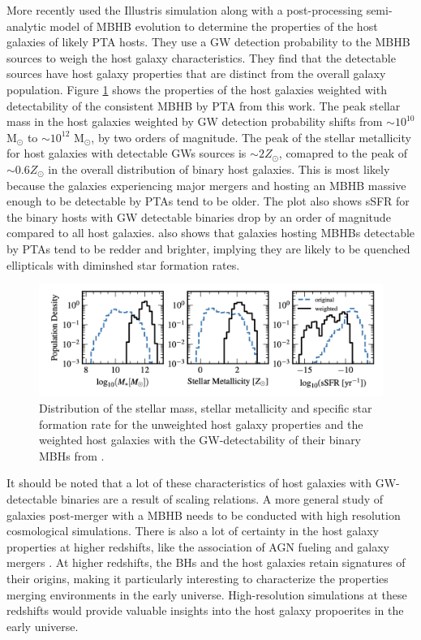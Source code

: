 \documentclass[11pt, letterpaper]{article}
\newcommand{\msun}{M$_{\odot}$}
\begin{document}
More recently \citet{Cella_2024} used the Illustris simulation along with a post-processing semi-analytic model of MBHB evolution to determine the properties of the host galaxies of likely PTA hosts. They use a GW detection probability to the MBHB sources to weigh the host galaxy characteristics. They find that the detectable sources have host galaxy properties that are distinct from the overall galaxy population. Figure \ref{fig:PTA-host-properties} shows the properties of the host galaxies weighted with detectability of the consistent MBHB by PTA from this work. The peak stellar mass in the host galaxies weighted by GW detection probability shifts from $\sim 10^{10}$ \msun{} to $\sim 10^{12}$ \msun{}, by two orders of magnitude. The peak of the stellar metallicity for host galaxies with detectable GWs sources is $\sim 2 Z_{\odot}$, comapred to the peak of $\sim 0.6 Z_{\odot}$ in the overall distribution of binary host galaxies. This is most likely because the galaxies experiencing major mergers and hosting an MBHB massive enough to be detectable by PTAs tend to be older. The plot also shows sSFR for the binary hosts with GW detectable binaries drop by an order of magnitude compared to all host galaxies. \citet{Cella_2024} also shows that galaxies hosting MBHBs detectable by PTAs tend to be redder and brighter, implying they are likely to be quenched ellipticals with diminshed star formation rates. 


\begin{figure}
    \centering
    \includegraphics[width=0.9\linewidth]{fig/host_property_PTA.png}
    \caption{Distribution of the stellar mass, stellar metallicity and specific star formation rate for the unweighted host galaxy properties and the weighted host galaxies with the GW-detectability of their binary MBHs from \citet{Cella_2024}.}
    \label{fig:PTA-host-properties}
\end{figure}


It should be noted that a lot of these characteristics of host galaxies with GW-detectable binaries are a result of scaling relations. A more general study of galaxies post-merger with a MBHB needs to be conducted with high resolution cosmological simulations. There is also a lot of certainty in the host galaxy properties at higher redshifts, like the association of AGN fueling and galaxy mergers \citep{Cisternas2011,Villforth2017,Bhowmick2020}. At higher redshifts, the BHs and the host galaxies retain signatures of their origins, making it particularly interesting to characterize the properties merging environments in the early universe. High-resolution simulations at these redshifts \citep{bhowmick2024introducingbrahmasimulationsuite} would provide valuable insights into the host galaxy propoerites in the early universe. 
\end{document}

